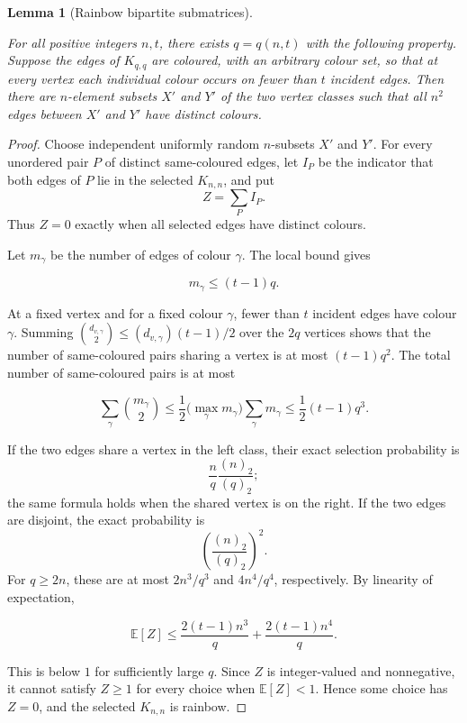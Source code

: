 \documentclass[a4paper,11pt,reqno]{amsart}
\theoremstyle{plain}
\newtheorem{lemma}[theorem]{Lemma}
\theoremstyle{definition}
\theoremstyle{remark}
\begin{document}
\begin{lemma}[Rainbow bipartite submatrices]\label{lemma-3.1-rainbow-bipartite-submatrices}

For all positive integers \(n,t\), there exists \(q=q(n,t)\) with the following property. Suppose the edges of \(K_{q,q}\) are coloured, with an arbitrary colour set, so that at every vertex each individual colour occurs on fewer than \(t\) incident edges. Then there are \(n\)-element subsets \(X'\) and \(Y'\) of the two vertex classes such that all \(n^2\) edges between \(X'\) and \(Y'\) have distinct colours.

\end{lemma}
\begin{proof}
Choose independent uniformly random \(n\)-subsets \(X'\) and \(Y'\). For every unordered pair \(P\) of distinct same-coloured edges, let \(I_P\) be the indicator that both edges of \(P\) lie in the selected \(K_{n,n}\), and put
\[
 Z=\sum_P I_P.
\]
Thus \(Z=0\) exactly when all selected edges have distinct colours.

Let \(m_\gamma\) be the number of edges of colour \(\gamma\). The local bound gives

\[
m_\gamma\le(t-1)q.
\]

At a fixed vertex and for a fixed colour \(\gamma\), fewer than \(t\)
incident edges have colour \(\gamma\). Summing
\(\binom{d_{v,\gamma}}2\le(d_{v,\gamma})(t-1)/2\) over the \(2q\)
vertices shows that the number of same-coloured pairs sharing a vertex is
at most \((t-1)q^2\). The total number of same-coloured pairs is at most

\[
\sum_\gamma\binom{m_\gamma}{2}
\le \frac12\bigl(\max_\gamma m_\gamma\bigr)\sum_\gamma m_\gamma
\le \frac12(t-1)q^3.
\]

If the two edges share a vertex in the left class, their exact selection
probability is
\[
 \frac nq\frac{(n)_2}{(q)_2};
\]
the same formula holds when the shared vertex is on the right. If the two
edges are disjoint, the exact probability is
\[
 \left(\frac{(n)_2}{(q)_2}\right)^2.
\]
For \(q\ge2n\), these are at most \(2n^3/q^3\) and \(4n^4/q^4\),
respectively. By linearity of expectation,

\[
\mathbb{E}\!\left[Z\right]
 \le\frac{2(t-1)n^3}{q}+\frac{2(t-1)n^4}{q}.
\]

This is below \(1\) for sufficiently large \(q\). Since \(Z\) is
integer-valued and nonnegative, it cannot satisfy \(Z\ge1\) for every
choice when \(\mathbb{E}\!\left[Z\right]<1\). Hence some choice has \(Z=0\), and the
selected \(K_{n,n}\) is rainbow.
\end{proof}
\end{document}
